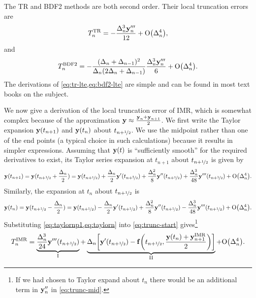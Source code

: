 The TR and BDF2 methods are both second order.
Their local truncation errors are \cite[261]{GreshoSani}
\begin{equation}
  \label{eq:tr-lte}
  \lte^\tr = -\frac{\dtn^3 \yv_n'''}{12}
  + \order{\dtn^4},
\end{equation}
and \cite[715]{GreshoSani}
\begin{equation}
  \label{eq:bdf2-lte}
  \lte^\bdf = -\frac{(\dtn + \dtx{n-1})^2}{\dtn(2\dtn + \dtx{n-1})}
  \frac{\dtn^3 \yv_n'''}{6}
  + \order{\dtn^4}.
\end{equation}
The derivations of \cref{eq:tr-lte,eq:bdf2-lte} are simple and can be found in most text books on the subject.

We now give a derivation of the local truncation error of IMR, which is somewhat complex because of the approximation $\boldsymbol{\mathrm{y}} \approx \frac{\boldsymbol{\mathrm{y}}_n + \boldsymbol{\mathrm{y}}_{n+1}}{2}$.
We first write the Taylor expansion $\boldsymbol{\mathrm{y}}(t_{n+1})$ and $\boldsymbol{\mathrm{y}}(t_{n})$ about $t_{n+\nicefrac{1}{2}}$.
We use the midpoint rather than one of the end points (a typical choice in such calculations) because it results in simpler expressions.
Assuming that $\boldsymbol{\mathrm{y}}(t)$ is ``sufficiently smooth'' for the required derivatives to exist, its Taylor series expansion at $t_{n+1}$ about $t_{n+\nicefrac{1}{2}}$ is given by
\begin{equation}
  \yv(t_{n+1}) = \yv(\thf + \frac{\dtn}{2}) = \yvhf + \frac{\dtn}{2} \yvhf[']
  + \frac{\dtn^2}{8} \yvhf['']
  + \frac{\dtn^3}{48} \yvhf[''']
  + \order{\dtn^4}.
  \label{eq:taylornp1}
\end{equation}
Similarly, the expansion at $t_n$ about $t_{n+\nicefrac{1}{2}}$ is
\begin{equation}
  \yv(t_n) = \yv(\thf - \frac{\dtn}{2}) = \yvhf - \frac{\dtn}{2} \yvhf[']
  + \frac{\dtn^2}{8} \yvhf['']
  - \frac{\dtn^3}{48} \yvhf[''']
  + \order{\dtn^4}.
  \label{eq:taylorn}
\end{equation}
Substituting \cref{eq:taylornp1,eq:taylorn} into \cref{eq:trunc-start} gives\footnote{If we had chosen to Taylor expand about $t_n$ there would be an additional term in $\boldsymbol{\mathrm{y}}_n''$ in \cref{eq:trunc-mid}.}
\begin{equation}
  \lte^\imr = \underbrace{\frac{\dtn^3}{24} \yvhf[''']}_{\text{I}}
  + \underbrace{\dtn\bigs{ \yvhf['] - \ffv{\thf, \frac{\yv(t_n) + \yv_{n+1}^\imr}{2}} }}_{\text{II}}
  + \order{\dtn^4}.
  \label{eq:trunc-mid}
\end{equation}

